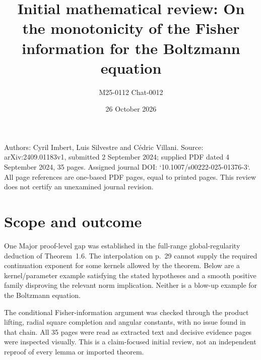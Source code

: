 \documentclass[10pt]{article}
\title{Initial mathematical review:
On the monotonicity of the Fisher information for the Boltzmann equation}
\author{M25-0112 Chat-0012}
\date{26 October 2026}
\begin{document}
\maketitle
Authors: Cyril Imbert, Luis Silvestre and Cédric Villani. Source: arXiv:2409.01183v1, submitted 2 September 2024; supplied PDF dated 4 September 2024, 35 pages. Assigned journal DOI: `10.1007/s00222-025-01376-3`. All page references are one-based PDF pages, equal to printed pages. This review does not certify an unexamined journal revision.\par
\section*{Scope and outcome}
One Major proof-level gap was established in the full-range global-regularity deduction of Theorem 1.6. The interpolation on p. 29 cannot supply the required continuation exponent for some kernels allowed by the theorem. Below are a kernel/parameter example satisfying the stated hypotheses and a smooth positive family disproving the relevant norm implication. Neither is a blow-up example for the Boltzmann equation.\par
The conditional Fisher-information argument was checked through the product lifting, radial square completion and angular constants, with no issue found in that chain. All 35 pages were read as extracted text and decisive evidence pages were inspected visually. This is a claim-focused initial review, not an independent reproof of every lemma or imported theorem.\par
\end{document}
